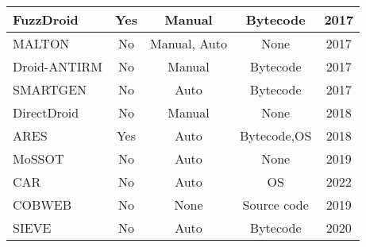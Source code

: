 \documentclass[preview, convert]{standalone}
\begin{document}
\begin{table*}[!ht]
\begin{tabular}{|C{2.8cm}||c|c|c|c|}
        FuzzDroid           & Yes           & Manual        & Bytecode      & 2017 \\ \hline
        MALTON              & No            & Manual, Auto  & None          & 2017 \\ \hline
        Droid-ANTIRM        & No            & Manual        & Bytecode      & 2017 \\ \hline
        SMARTGEN            & No            & Auto          & Bytecode      & 2017 \\ \hline
        DirectDroid         & No            & Manual        & None          & 2018 \\ \hline
        ARES                & Yes           & Auto          & Bytecode,OS   & 2018 \\ \hline
        MoSSOT              & No            & Auto          & None          & 2019 \\ \hline
        CAR                 & No            & Auto          & OS            & 2022 \\ \hline
        COBWEB              & No            & None          & Source code   & 2019 \\ \hline
        SIEVE               & No            & Auto          & Bytecode      & 2020 \\ \hline
    \end{tabular}
\end{table*}
\end{document}
